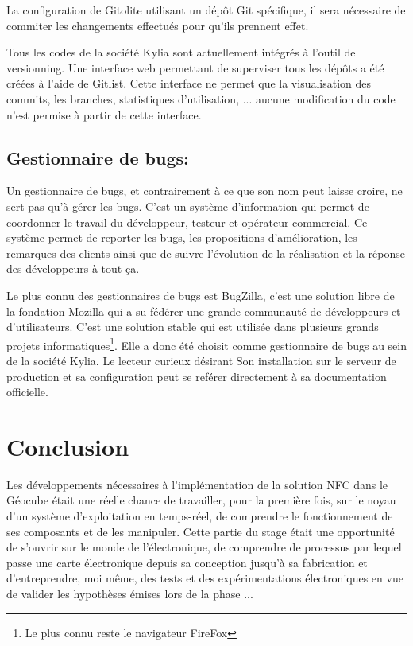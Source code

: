 \documentclass{themeensg}
\begin{document}
La configuration de Gitolite utilisant un dépôt Git spécifique, il sera nécessaire de commiter les changements effectués pour qu'ils prennent effet.

Tous les codes de la société Kylia sont actuellement intégrés à l'outil de versionning. Une interface web permettant de superviser tous les dépôts a été créées à l'aide de Gitlist. Cette interface ne permet que la visualisation des commits, les branches, statistiques d'utilisation, ... aucune modification du code n'est permise à partir de cette interface.

\section{Gestionnaire de bugs:}
Un gestionnaire de bugs, et contrairement à ce que son nom peut laisse croire, ne sert pas qu'à gérer les bugs. C'est un système d'information qui permet de coordonner le travail du développeur, testeur et opérateur commercial. Ce système permet de reporter les bugs, les propositions d'amélioration, les remarques des clients ainsi que de suivre l'évolution de la réalisation et la réponse des développeurs à tout ça.

Le plus connu des gestionnaires de bugs est BugZilla, c'est une solution libre de la fondation Mozilla qui a su fédérer une grande communauté de développeurs et d'utilisateurs. C'est une solution stable qui est utilisée dans plusieurs grands projets informatiques\footnote{Le plus connu reste le navigateur FireFox}. Elle a donc été choisit comme gestionnaire de bugs au sein de la société Kylia. Le lecteur curieux désirant Son installation sur le serveur de production et sa configuration peut se reférer directement à sa documentation officielle.


\newevenpage
\chapter*{Conclusion}
  \vspace{1.5cm}

Les développements nécessaires à l'implémentation de la solution NFC dans le Géocube était une réelle chance de travailler, pour la première fois, sur le noyau d'un système d'exploitation en temps-réel, de comprendre le fonctionnement de ses composants et de les manipuler. Cette partie du stage était une opportunité de s'ouvrir sur le monde de l'électronique, de comprendre de processus par lequel passe une carte électronique depuis sa conception jusqu'à sa fabrication et d'entreprendre, moi même, des tests et des expérimentations électroniques en vue de valider les hypothèses émises lors de la phase ...
\end{document}
